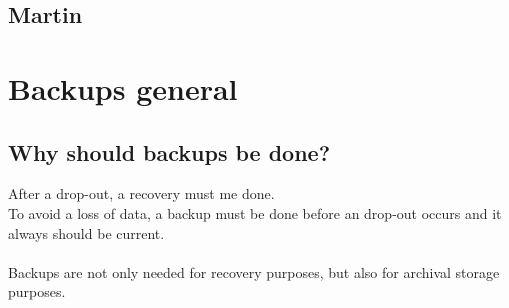 \documentclass[10pt]{article}
\begin{document}
\subsection{Martin}
\newpage
\section{Backups general}
\subsection{Why should backups be done?}
After a drop-out, a recovery must me done. \\
To avoid a loss of data, a backup must be done before an drop-out occurs and it always should be current. \\ \\
Backups are not only needed for recovery purposes, but also for archival storage purposes.
\end{document}
